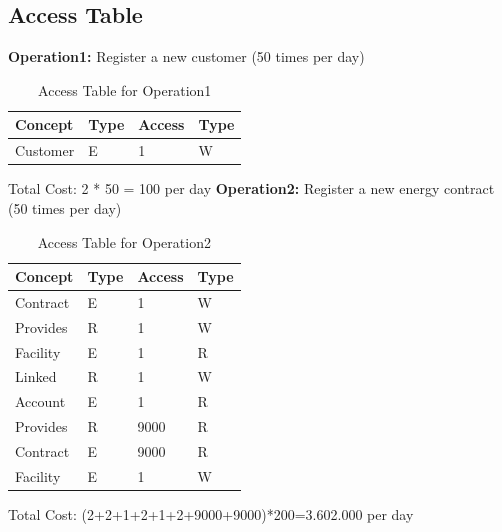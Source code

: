 \subsection{Access Table}

\textbf{Operation1:} Register a new customer (50 times per day)\\
\begin{table}[H]
    \renewcommand{\arraystretch}{1.3} %
    \begin{tabularx}{\textwidth}{|X|X|X|X|}
    \hline
    \textbf{Concept}& \textbf{Type}  & \textbf{Access}    & \textbf{Type}     \\ \hline
    Customer & E & 1 & W \\ \hline
    \end{tabularx}
    \caption{Access Table for Operation1}
\end{table}
\noindent Total Cost: 2 * 50 = 100 per day
\newline
\textbf{Operation2:} Register a new energy contract (50 times per day)\\
\begin{table}[H]
    \renewcommand{\arraystretch}{1.3} %
    \begin{tabularx}{\textwidth}{|X|X|X|X|}
    \hline
    \textbf{Concept}& \textbf{Type}  & \textbf{Access}    & \textbf{Type}     \\ \hline
    Contract & E & 1 & W \\ \hline
    Provides & R & 1 & W \\ \hline
    Facility & E & 1 & R \\ \hline
    Linked & R & 1 & W \\ \hline
    Account & E & 1 & R \\ \hline
    Provides & R & 9000 & R \\ \hline
    Contract & E & 9000 & R \\ \hline
    Facility & E & 1 & W \\ \hline
    \end{tabularx}
    \caption{Access Table for Operation2}
\end{table}
\noindent Total Cost: (2+2+1+2+1+2+9000+9000)*200=3.602.000 per day

